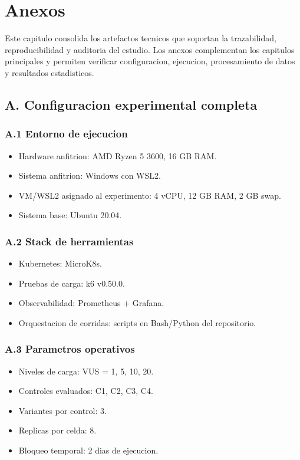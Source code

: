 \chapter{Anexos}
\label{cap:anexos}

Este capitulo consolida los artefactos tecnicos que soportan la trazabilidad, reproducibilidad y auditoria del estudio. Los anexos complementan los capitulos principales y permiten verificar configuracion, ejecucion, procesamiento de datos y resultados estadisticos.

\section{A. Configuracion experimental completa}
\label{anx:config}

\subsection{A.1 Entorno de ejecucion}
\begin{itemize}
  \item Hardware anfitrion: AMD Ryzen 5 3600, 16 GB RAM.
  \item Sistema anfitrion: Windows con WSL2.
  \item VM/WSL2 asignado al experimento: 4 vCPU, 12 GB RAM, 2 GB swap.
  \item Sistema base: Ubuntu 20.04.
\end{itemize}

\subsection{A.2 Stack de herramientas}
\begin{itemize}
  \item Kubernetes: MicroK8s.
  \item Pruebas de carga: k6 v0.50.0.
  \item Observabilidad: Prometheus + Grafana.
  \item Orquestacion de corridas: scripts en Bash/Python del repositorio.
\end{itemize}

\subsection{A.3 Parametros operativos}
\begin{itemize}
  \item Niveles de carga: VUS = 1, 5, 10, 20.
  \item Controles evaluados: C1, C2, C3, C4.
  \item Variantes por control: 3.
  \item Replicas por celda: 8.
  \item Bloqueo temporal: 2 dias de ejecucion.
\end{itemize}

